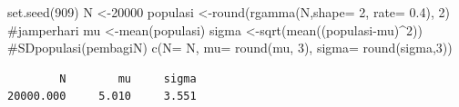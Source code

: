 \documentclass[
  indonesian,
  letterpaper,
]{book}
\newenvironment{Shaded}{\begin{snugshade}}{\end{snugshade}}
\newcommand{\AttributeTok}[1]{\textcolor[rgb]{0.40,0.45,0.13}{#1}}
\newcommand{\CommentTok}[1]{\textcolor[rgb]{0.37,0.37,0.37}{#1}}
\newcommand{\DecValTok}[1]{\textcolor[rgb]{0.68,0.00,0.00}{#1}}
\newcommand{\FloatTok}[1]{\textcolor[rgb]{0.68,0.00,0.00}{#1}}
\newcommand{\FunctionTok}[1]{\textcolor[rgb]{0.28,0.35,0.67}{#1}}
\newcommand{\NormalTok}[1]{\textcolor[rgb]{0.00,0.23,0.31}{#1}}
\newcommand{\OtherTok}[1]{\textcolor[rgb]{0.00,0.23,0.31}{#1}}
\newcommand{\SpecialCharTok}[1]{\textcolor[rgb]{0.37,0.37,0.37}{#1}}
\begin{document}
\begin{Shaded}
\begin{Highlighting}[]
\FunctionTok{set.seed}\NormalTok{(}\DecValTok{909}\NormalTok{)}
\NormalTok{N }\OtherTok{\textless{}{-}}\DecValTok{20000}
\NormalTok{populasi }\OtherTok{\textless{}{-}}\FunctionTok{round}\NormalTok{(}\FunctionTok{rgamma}\NormalTok{(N,}\AttributeTok{shape=} \DecValTok{2}\NormalTok{, }\AttributeTok{rate=} \FloatTok{0.4}\NormalTok{), }\DecValTok{2}\NormalTok{) }\CommentTok{\#jamperhari}
\NormalTok{mu }\OtherTok{\textless{}{-}}\FunctionTok{mean}\NormalTok{(populasi)}
\NormalTok{sigma }\OtherTok{\textless{}{-}}\FunctionTok{sqrt}\NormalTok{(}\FunctionTok{mean}\NormalTok{((populasi}\SpecialCharTok{{-}}\NormalTok{mu)}\SpecialCharTok{\^{}}\DecValTok{2}\NormalTok{)) }\CommentTok{\#SDpopulasi(pembagiN) }
\FunctionTok{c}\NormalTok{(}\AttributeTok{N=}\NormalTok{ N, }\AttributeTok{mu=} \FunctionTok{round}\NormalTok{(mu, }\DecValTok{3}\NormalTok{), }\AttributeTok{sigma=} \FunctionTok{round}\NormalTok{(sigma,}\DecValTok{3}\NormalTok{))}
\end{Highlighting}
\end{Shaded}

\begin{verbatim}
        N        mu     sigma 
20000.000     5.010     3.551 
\end{verbatim}
\end{document}
